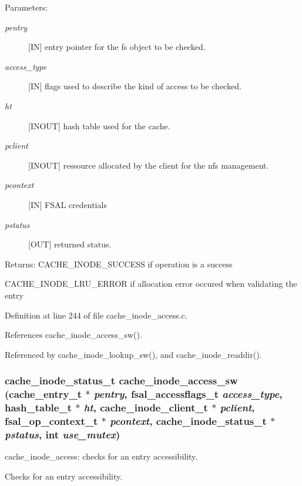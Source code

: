 \begin{Desc}
\item[Parameters:]
\begin{description}
\item[{\em pentry}][IN] entry pointer for the fs object to be checked. \item[{\em access\_\-type}][IN] flags used to describe the kind of access to be checked. \item[{\em ht}][INOUT] hash table used for the cache. \item[{\em pclient}][INOUT] ressource allocated by the client for the nfs management. \item[{\em pcontext}][IN] FSAL credentials \item[{\em pstatus}][OUT] returned status.\end{description}
\end{Desc}
\begin{Desc}
\item[Returns:]CACHE\_\-INODE\_\-SUCCESS if operation is a success \par
 

CACHE\_\-INODE\_\-LRU\_\-ERROR if allocation error occured when validating the entry \end{Desc}


Definition at line 244 of file cache\_\-inode\_\-access.c.

References cache\_\-inode\_\-access\_\-sw().

Referenced by cache\_\-inode\_\-lookup\_\-sw(), and cache\_\-inode\_\-readdir().
\subsubsection{\setlength{\rightskip}{0pt plus 5cm}cache\_\-inode\_\-status\_\-t cache\_\-inode\_\-access\_\-sw (cache\_\-entry\_\-t $\ast$ {\em pentry}, fsal\_\-accessflags\_\-t {\em access\_\-type}, hash\_\-table\_\-t $\ast$ {\em ht}, cache\_\-inode\_\-client\_\-t $\ast$ {\em pclient}, fsal\_\-op\_\-context\_\-t $\ast$ {\em pcontext}, cache\_\-inode\_\-status\_\-t $\ast$ {\em pstatus}, int {\em use\_\-mutex})}\label{cache__inode__access_8c_a0}


cache\_\-inode\_\-access: checks for an entry accessibility.

Checks for an entry accessibility.


